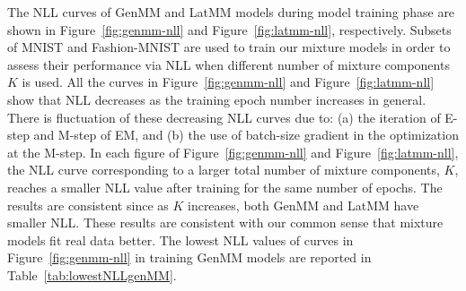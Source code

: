 The NLL curves of GenMM and LatMM models during model training phase are shown in Figure~\ref{fig:genmm-nll} and Figure~\ref{fig:latmm-nll}, respectively. Subsets of MNIST and Fashion-MNIST are used to train our mixture models in order to assess their performance via NLL when different number of mixture components $K$ is used. All the curves in Figure~\ref{fig:genmm-nll} and Figure~\ref{fig:latmm-nll} show that NLL decreases as the training epoch number increases in general. There is fluctuation of these decreasing NLL curves due to: (a) the iteration of E-step and M-step of EM, and (b) the use of batch-size gradient in the optimization at the M-step. In each figure of Figure~\ref{fig:genmm-nll} and Figure~\ref{fig:latmm-nll}, the NLL curve corresponding to a larger total number of mixture components, $K$, reaches a smaller NLL value after training for the same number of epochs. The results are consistent since as $K$ increases, both GenMM and LatMM have smaller NLL. These results are consistent with our common sense that mixture models fit real data better. The lowest NLL values of curves in Figure~\ref{fig:genmm-nll} in training GenMM models are reported in Table~\ref{tab:lowestNLLgenMM}.

